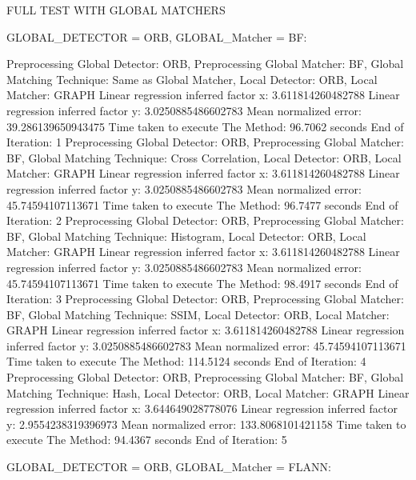 FULL TEST WITH GLOBAL MATCHERS

GLOBAL\_DETECTOR = ORB, GLOBAL\_Matcher = BF:

Preprocessing Global Detector: ORB, Preprocessing Global Matcher: BF, Global Matching Technique: Same as Global Matcher, Local Detector: ORB, Local Matcher: GRAPH
Linear regression inferred factor x: 3.611814260482788
Linear regression inferred factor y: 3.0250885486602783
Mean normalized error: 39.286139650943475
Time taken to execute The Method: 96.7062 seconds
End of Iteration: 1
Preprocessing Global Detector: ORB, Preprocessing Global Matcher: BF, Global Matching Technique: Cross Correlation, Local Detector: ORB, Local Matcher: GRAPH
Linear regression inferred factor x: 3.611814260482788
Linear regression inferred factor y: 3.0250885486602783
Mean normalized error: 45.74594107113671
Time taken to execute The Method: 96.7477 seconds
End of Iteration: 2
Preprocessing Global Detector: ORB, Preprocessing Global Matcher: BF, Global Matching Technique: Histogram, Local Detector: ORB, Local Matcher: GRAPH
Linear regression inferred factor x: 3.611814260482788
Linear regression inferred factor y: 3.0250885486602783
Mean normalized error: 45.74594107113671
Time taken to execute The Method: 98.4917 seconds
End of Iteration: 3
Preprocessing Global Detector: ORB, Preprocessing Global Matcher: BF, Global Matching Technique: SSIM, Local Detector: ORB, Local Matcher: GRAPH
Linear regression inferred factor x: 3.611814260482788
Linear regression inferred factor y: 3.0250885486602783
Mean normalized error: 45.74594107113671
Time taken to execute The Method: 114.5124 seconds
End of Iteration: 4
Preprocessing Global Detector: ORB, Preprocessing Global Matcher: BF, Global Matching Technique: Hash, Local Detector: ORB, Local Matcher: GRAPH
Linear regression inferred factor x: 3.644649028778076
Linear regression inferred factor y: 2.9554238319396973
Mean normalized error: 133.8068101421158
Time taken to execute The Method: 94.4367 seconds
End of Iteration: 5

GLOBAL\_DETECTOR = ORB, GLOBAL\_Matcher = FLANN:


